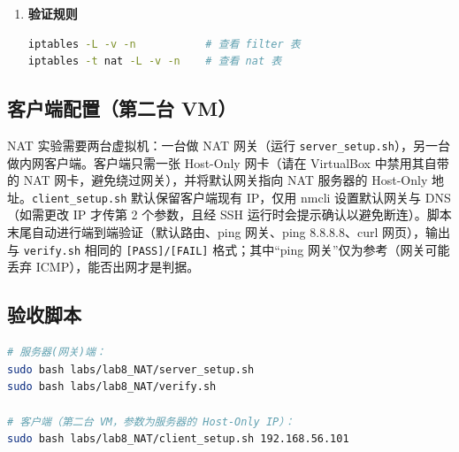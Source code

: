 \documentclass[12pt,a4paper]{ctexart}
\begin{document}
\begin{enumerate}[label=\arabic*.,leftmargin=*]
\begin{cmdbox}
\begin{lstlisting}[language=bash]
# NAT 转发：内网→外网
iptables -A FORWARD -i "$LAN_IF" -o "$WAN_IF" -j ACCEPT

# 外网→内网只放行 Web、DNS、邮件服务
iptables -A FORWARD -i "$WAN_IF" -o "$LAN_IF" -p tcp --dport 80  -j ACCEPT
iptables -A FORWARD -i "$WAN_IF" -o "$LAN_IF" -p tcp --dport 443 -j ACCEPT
iptables -A FORWARD -i "$WAN_IF" -o "$LAN_IF" -p udp --dport 53  -j ACCEPT
iptables -A FORWARD -i "$WAN_IF" -o "$LAN_IF" -p tcp --dport 25  -j ACCEPT
iptables -A FORWARD -i "$WAN_IF" -o "$LAN_IF" -p tcp --dport 110 -j ACCEPT

# SNAT 地址伪装
iptables -t nat -A POSTROUTING -o "$WAN_IF" -j MASQUERADE

# 保存规则
iptables-save > /etc/sysconfig/iptables
  \end{lstlisting}
  \end{cmdbox}

  \item \textbf{验证规则}

  \begin{cmdbox}
  \begin{lstlisting}[language=bash]
iptables -L -v -n           # 查看 filter 表
iptables -t nat -L -v -n    # 查看 nat 表
  \end{lstlisting}
  \end{cmdbox}

\end{enumerate}

\subsection{客户端配置（第二台 VM）}

NAT 实验需要两台虚拟机：一台做 NAT 网关（运行 \texttt{server\_setup.sh}），另一台做内网客户端。客户端只需一张 Host-Only 网卡（请在 VirtualBox 中禁用其自带的 NAT 网卡，避免绕过网关），并将默认网关指向 NAT 服务器的 Host-Only 地址。\texttt{client\_setup.sh} 默认保留客户端现有 IP，仅用 nmcli 设置默认网关与 DNS（如需更改 IP 才传第 2 个参数，且经 SSH 运行时会提示确认以避免断连）。脚本末尾自动进行端到端验证（默认路由、ping 网关、ping 8.8.8.8、curl 网页），输出与 \texttt{verify.sh} 相同的 \texttt{[PASS]/[FAIL]} 格式；其中“ping 网关”仅为参考（网关可能丢弃 ICMP），能否出网才是判据。

\subsection{验收脚本}

\begin{cmdbox}
\begin{lstlisting}[language=bash]
# 服务器(网关)端：
sudo bash labs/lab8_NAT/server_setup.sh
sudo bash labs/lab8_NAT/verify.sh

# 客户端（第二台 VM，参数为服务器的 Host-Only IP）：
sudo bash labs/lab8_NAT/client_setup.sh 192.168.56.101
\end{lstlisting}
\end{cmdbox}
\end{document}
